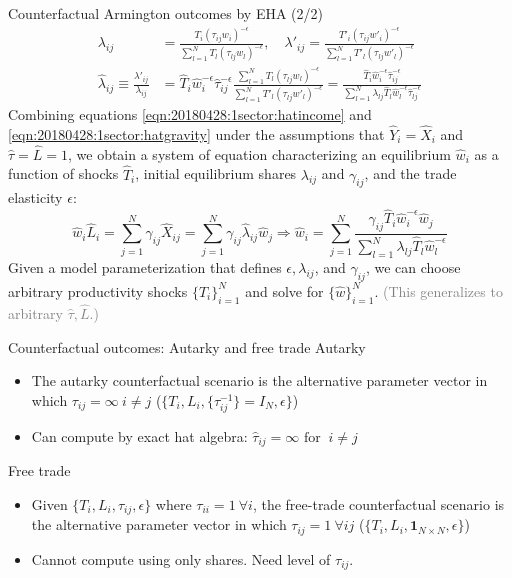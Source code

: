 \documentclass[10pt,notes=hide]{beamer}
\begin{document}
\begin{frame}{Counterfactual Armington outcomes by EHA (2/2)}
\begin{align}
\lambda_{ij} 
&=
\frac{T_{i} \left(\tau_{ij}w_i\right)^{-\epsilon}}{\sum_{l=1}^{N} T_{l}  \left(\tau_{lj}w_l\right)^{-\epsilon}},
\quad
\lambda'_{ij} 
=
\frac{T'_{i} \left(\tau_{ij}w'_i\right)^{-\epsilon}}{\sum_{l=1}^{N} T'_{l}  \left(\tau_{lj}w'_l\right)^{-\epsilon}}
\nonumber \\
\hat{\lambda}_{ij}
\equiv 
\frac{\lambda'_{ij}}{\lambda_{ij}}
&=
\hat{T}_{i} \hat{w}_{i}^{-\epsilon} \hat{\tau}_{ij}^{-\epsilon}
\frac{\sum_{l=1}^{N} T_{l}  \left(\tau_{lj}w_l \right)^{-\epsilon}}
	 {\sum_{l=1}^{N} T'_{l} \left(\tau_{lj}w'_l\right)^{-\epsilon}}
=
\frac{\hat{T}_{i} \hat{w}_{i}^{-\epsilon}\hat{\tau}_{ij}^{-\epsilon}}{\sum_{l=1}^{N} \lambda_{lj} \hat{T}_{l} \hat{w}_l^{-\epsilon} \hat{\tau}_{lj}^{-\epsilon}}
\label{eqn:20180428:1sector:hatgravity}
\end{align}
Combining equations \eqref{eqn:20180428:1sector:hatincome} and \eqref{eqn:20180428:1sector:hatgravity}
under the assumptions that $\hat{Y}_{i}=\hat{X}_{i}$ and $\hat{\tau}=\hat{L}=1$, we
obtain a system of equation characterizing an equilibrium $\hat{w}_i$ as a
function of shocks $\hat{T}_i$, initial equilibrium shares $\lambda_{ij}$ and
$\gamma_{ij}$, and the trade elasticity $\epsilon$:
\begin{equation}
\hat{w}_i \hat{L}_i
= 
\sum_{j=1}^{N} \gamma_{ij} \hat{X}_{ij}
=
\sum_{j=1}^{N} \gamma_{ij} \hat{\lambda}_{ij} \hat{w}_{j}
\nonumber 
\Rightarrow
\hat{w}_i
= 
\sum_{j=1}^{N}
\frac{\gamma_{ij} \hat{T}_{i} \hat{w}_{i}^{-\epsilon} \hat{w}_{j} }
{\sum_{l=1}^{N} \lambda_{lj} \hat{T}_{l} \hat{w}_l^{-\epsilon}}
\label{eqn:20180428:1sector:hatequilibriumequations}
\end{equation}
Given a model parameterization that defines $\epsilon, \lambda_{ij}$, and $\gamma_{ij}$,
we can choose arbitrary productivity shocks $\{\hat{T}_{i}\}_{i=1}^{N}$ and solve for $\{\hat{w}\}_{i=1}^{N}$.
\textcolor{gray}{(This generalizes to arbitrary $\hat{\tau},\hat{L}$.)}
\end{frame}
\begin{frame}{Counterfactual outcomes: Autarky and free trade}
Autarky
\begin{itemize}
\item The autarky counterfactual scenario is the alternative parameter vector
in which $\tau_{ij} = \infty \ i \neq j$
($\{T_i,L_i,\{\tau_{ij}^{-1}\}=I_N,\epsilon\}$)
\item Can compute by exact hat algebra: $\hat{\tau}_{ij} = \infty \text{ for } \ i \neq j$
\end{itemize}
Free trade
\begin{itemize}
\item Given $\{T_i,L_i,\tau_{ij},\epsilon\}$ where $\tau_{ii} = 1 \ \forall i$,
the free-trade counterfactual scenario is the alternative parameter vector
in which $\tau_{ij} = 1 \ \forall ij$
($\{T_i,L_i,\mathbf{1}_{N \times N},\epsilon\}$)
\item Cannot compute using only shares. Need level of $\tau_{ij}$.
\end{itemize}
\end{frame}
\end{document}
